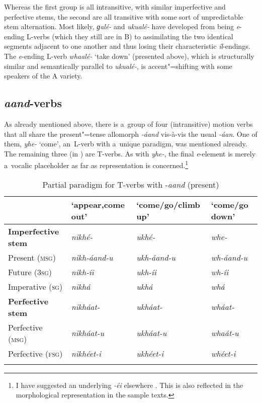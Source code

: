 Whereas the first group is all intransitive, with similar imperfective and perfective stems, the second are all transitive with some sort of unpredictable stem alternation. Most likely, \textit{ɡalé-} and \textit{ukualé-} have developed from being \textit{e}-ending L-verbs (which they still are in B) to assimilating the two identical segments adjacent to one another and thus losing their characteristic \textit{íl}-endings. The \textit{e}-ending L-verb \textit{whaalé-} `take down' (presented above), which is structurally similar and semantically parallel to \textit{ukualé-}, is accent"=shifting with some speakers of the A variety. 


\subsection{\textit{aand}-verbs}
\label{subsec:8-3-8}


As already mentioned above, there is a~group of four (intransitive) motion verbs that all share the present"=tense allomorph \textit{-áand} vis-à-vis the usual \textit{-áan}. One of them, \textit{yhe-} `come', an~L-verb with a~unique paradigm, was mentioned already. The remaining three (in ) are T-verbs. As with \textit{yhe-}, the final \textit{e}-element is merely a~vocalic placeholder as far as representation is concerned.\footnote{I have suggested an underlying \textit{-éi} elsewhere \citep{liljegrenhaider2011,liljegrenhaider2015}. This is also reflected in the morphological representation in the sample texts.}


\begin{table}[t]
\caption{Partial paradigm for T-verbs with -\textit{aand} (present)}
\begin{tabularx}{\textwidth}{ l Q Q Q }
\lsptoprule
&
`appear,\newline come out' &
`come/go/\newline climb up' &
`come/go down'\\\midrule
\textbf{Imperfective stem} &
\textit{nikhé- } &
\textit{ukhé-} &
\textit{whe-} \\
Present (\textsc{msg}) &
\textit{nikh-áand-u} &
\textit{ukh-áand-u} &
\textit{wh-áand-u} \\
Future (\textsc{3sg}) &
\textit{nikh-íi} &
\textit{ukh-íi} &
\textit{wh-íi} \\
Imperative (\textsc{sg}) &
\textit{nikhá} &
\textit{ukhá} &
\textit{whá} \\
\textbf{Perfective stem} &
\textit{nikháat-} &
\textit{ukháat-} &
\textit{wháat-} \\
Perfective (\textsc{msg}) &
\textit{nikháat-u} &
\textit{ukháat-u} &
\textit{whaát-u} \\
Perfective (\textsc{fsg}) &
\textit{nikhéet-i} &
\textit{ukhéet-i} &
\textit{whéet-i} \\\lspbottomrule
\end{tabularx}
\label{tab:8-10}
\end{table}


